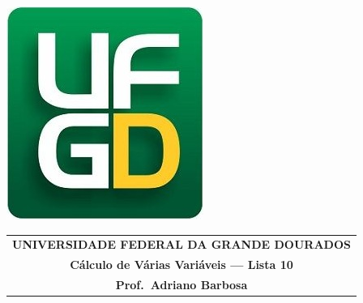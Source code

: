 \documentclass[a4paper,5pt]{amsbook}
\begin{document}
\thispagestyle{empty}
\pagestyle{empty}
\begin{minipage}[h]{0.14\textwidth}
	\includegraphics[scale=0.24]{../../ufgd.png}
\end{minipage}
\begin{minipage}[h]{\textwidth}
\begin{tabular}{c}
{{\bf UNIVERSIDADE FEDERAL DA GRANDE DOURADOS}}\\
{{\bf C\'alculo de V\'arias Vari\'aveis --- Lista 10}}\\
{{\bf Prof.\ Adriano Barbosa}}\\
\end{tabular}
\vspace{-0.45cm}
%
\end{minipage}

\end{document}

